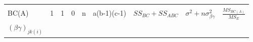 \documentclass[12pt,]{article}
\begin{document}
\begin{longtable}[]{@{}lllllllll@{}}
\begin{minipage}[t]{0.03\columnwidth}
\strut
\end{minipage} & \begin{minipage}[t]{0.03\columnwidth}\raggedright
\strut
\end{minipage} & \begin{minipage}[t]{0.03\columnwidth}\raggedright
\strut
\end{minipage} & \begin{minipage}[t]{0.12\columnwidth}\raggedright
\strut
\end{minipage} & \begin{minipage}[t]{0.15\columnwidth}\raggedright
\strut
\end{minipage} & \begin{minipage}[t]{0.21\columnwidth}\raggedright
\strut
\end{minipage} & \begin{minipage}[t]{0.09\columnwidth}\raggedright
\strut
\end{minipage}\tabularnewline
\begin{minipage}[t]{0.06\columnwidth}\raggedright
BC(A)\strut
\end{minipage} & \begin{minipage}[t]{0.03\columnwidth}\raggedright
1\strut
\end{minipage} & \begin{minipage}[t]{0.03\columnwidth}\raggedright
1\strut
\end{minipage} & \begin{minipage}[t]{0.03\columnwidth}\raggedright
0\strut
\end{minipage} & \begin{minipage}[t]{0.03\columnwidth}\raggedright
n\strut
\end{minipage} & \begin{minipage}[t]{0.12\columnwidth}\raggedright
a(b-1)(c-1)\strut
\end{minipage} & \begin{minipage}[t]{0.15\columnwidth}\raggedright
\(SS_{BC}+SS_{ABC}\)\strut
\end{minipage} & \begin{minipage}[t]{0.21\columnwidth}\raggedright
\(\sigma^2+n\sigma^2_{\beta\gamma}\)\strut
\end{minipage} & \begin{minipage}[t]{0.09\columnwidth}\raggedright
\(\frac{MS_{BC(A)}}{MS_{E}}\)\strut
\end{minipage}\tabularnewline
\begin{minipage}[t]{0.06\columnwidth}\raggedright
\((\beta\gamma)_{jk(i)}\)\strut

\end{minipage}
\end{longtable}
\end{document}
